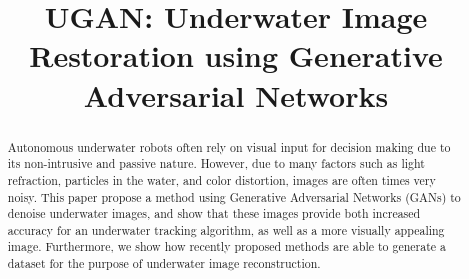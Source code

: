 \documentclass[conference]{IEEEtran}
\begin{document}
\title{UGAN: Underwater Image Restoration using Generative Adversarial Networks}

\author{
\and
{}
\and
{}
}

% 

\maketitle

\begin{abstract}
Autonomous underwater robots often rely on visual input for decision making due to its non-intrusive and passive nature.
However, due to many factors such as light refraction, particles in the water, and color distortion, images are often times very noisy.
This paper propose a method using Generative Adversarial Networks (GANs) to denoise underwater images, and show that these images provide both increased accuracy
for an underwater tracking algorithm, as well as a more visually appealing image. Furthermore, we show how recently
proposed methods are able to generate a dataset for the purpose of underwater image reconstruction.
\end{abstract}
\end{document}
